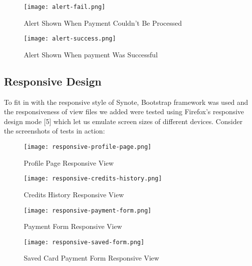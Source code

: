 \begin{figure}[!hbt]
  	\centering
 	\texttt{[image: alert-fail.png]}
  	\caption{Alert Shown When Payment Couldn't Be Processed}
 	\label{fig:alert-success}
\end{figure}

\begin{figure}[!hbt]
  	\centering
 	\texttt{[image: alert-success.png]}
  	\caption{Alert Shown When payment Was Successful}
 	\label{fig:alert-fail}
\end{figure}

\subsection{Responsive Design}
\label{subsec:responsive-design}

To fit in with the responsive style of Synote, Bootstrap framework was used and the responsiveness of view files we added were tested using Firefox’s responsive design mode [5] which let us emulate screen sizes of different devices. Consider the screenshots of tests in action:\\

\begin{figure}[!htb]
    \centering
    \begin{minipage}{.45\textwidth}
        \centering
        \texttt{[image: responsive-profile-page.png]}
          \caption{Profile Page Responsive View}
        \label{fig:responsive-profile}
        \texttt{[image: responsive-credits-history.png]}
          \caption{Credits History Responsive View}
        \label{fig:responsive-credits-history}
    \end{minipage}%
    \hspace{0.1cm}
    \begin{minipage}{0.5\textwidth}
        \centering
        \centering
      \texttt{[image: responsive-payment-form.png]}
        \caption{Payment Form Responsive View}
      \label{fig:responsive-payment-form}
    \end{minipage}
\end{figure}

\begin{figure}[!hbt]
    \centering
  \texttt{[image: responsive-saved-form.png]}
    \caption{Saved Card Payment Form Responsive View}
  \label{fig:responsive-saved-cards-form}
\end{figure}
